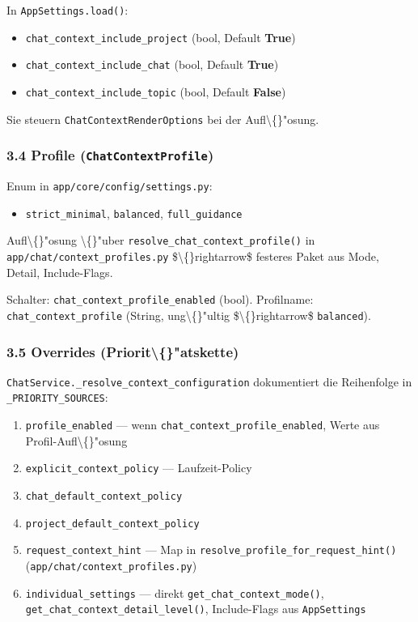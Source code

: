 In \texttt{AppSettings.load()}:

\begin{itemize}
\item \texttt{chat\_context\_include\_project} (bool, Default \textbf{True})
\item \texttt{chat\_context\_include\_chat} (bool, Default \textbf{True})
\item \texttt{chat\_context\_include\_topic} (bool, Default \textbf{False})
\end{itemize}

Sie steuern \texttt{ChatContextRenderOptions} bei der Aufl\textbackslash\{\}"osung.

\subsubsection{3.4 Profile (\texttt{ChatContextProfile})}

Enum in \texttt{app/core/config/settings.py}:

\begin{itemize}
\item \texttt{strict\_minimal}, \texttt{balanced}, \texttt{full\_guidance}
\end{itemize}

Aufl\textbackslash\{\}"osung \textbackslash\{\}"uber \texttt{resolve\_chat\_context\_profile()} in \texttt{app/chat/context\_profiles.py} \$\textbackslash\{\}rightarrow\$ festeres Paket aus Mode, Detail, Include-Flags.

Schalter: \texttt{chat\_context\_profile\_enabled} (bool). Profilname: \texttt{chat\_context\_profile} (String, ung\textbackslash\{\}"ultig \$\textbackslash\{\}rightarrow\$ \texttt{balanced}).

\subsubsection{3.5 Overrides (Priorit\textbackslash\{\}"atskette)}

\texttt{ChatService.\_resolve\_context\_configuration} dokumentiert die Reihenfolge in \texttt{\_PRIORITY\_SOURCES}:

\begin{enumerate}
\item \texttt{profile\_enabled} --- wenn \texttt{chat\_context\_profile\_enabled}, Werte aus Profil-Aufl\textbackslash\{\}"osung
\item \texttt{explicit\_context\_policy} --- Laufzeit-Policy
\item \texttt{chat\_default\_context\_policy}
\item \texttt{project\_default\_context\_policy}
\item \texttt{request\_context\_hint} --- Map in \texttt{resolve\_profile\_for\_request\_hint()} (\texttt{app/chat/context\_profiles.py})
\item \texttt{individual\_settings} --- direkt \texttt{get\_chat\_context\_mode()}, \texttt{get\_chat\_context\_detail\_level()}, Include-Flags aus \texttt{AppSettings}
\end{enumerate}

